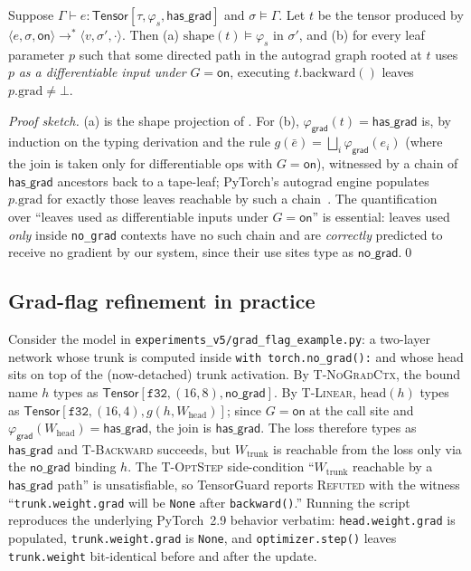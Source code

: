 \begin{theorem}
\label{thm:grad-soundness}
Suppose $\Gamma\vdash e:\mathsf{Tensor}[\tau,\varphi_s,\mathsf{has\_grad}]$
and $\sigma\models\Gamma$. Let $t$ be the tensor produced by
$\langle e,\sigma,\mathsf{on}\rangle\to^*\langle v,\sigma',\cdot\rangle$.
Then (a) $\mathrm{shape}(t)\models\varphi_s$ in $\sigma'$, and
(b) for every leaf parameter $p$ such that some directed path in
the autograd graph rooted at $t$ uses $p$ \emph{as a
differentiable input under} $G=\mathsf{on}$, executing
$t.\mathrm{backward}()$ leaves $p.\mathrm{grad}\neq\bot$.
\end{theorem}
\begin{proof}[Proof sketch]
(a) is the shape projection of . For (b),
$\varphi_{\mathsf{grad}}(t)=\mathsf{has\_grad}$ is, by induction
on the typing derivation and the rule
$g(\bar e)=\bigsqcup_i\varphi_{\mathsf{grad}}(e_i)$ (where the
join is taken only for differentiable ops with $G=\mathsf{on}$),
witnessed by a chain of $\mathsf{has\_grad}$ ancestors back to a
tape-leaf; PyTorch's autograd engine populates
$p.\mathrm{grad}$ for exactly those leaves
reachable by such a chain~\cite{paszke2019pytorch}. The
quantification over ``leaves used as differentiable inputs under
$G=\mathsf{on}$'' is essential: leaves used \emph{only} inside
\texttt{no\_grad} contexts have no such chain and are
\emph{correctly} predicted to receive no gradient by our system,
since their use sites type as $\mathsf{no\_grad}$.\qed
\end{proof}

\subsection{Grad-flag refinement in practice}
\label{sec:rt:gradflag}

Consider the model in
\texttt{experiments\_v5/grad\_flag\_example.py}: a
two-layer network whose trunk is computed inside
\texttt{with torch.no\_grad():} and whose head sits on top of
the (now-detached) trunk activation. By
\textsc{T-NoGradCtx}, the bound name $h$ types as
$\mathsf{Tensor}[\mathtt{f32},(16,8),\mathsf{no\_grad}]$. By
\textsc{T-Linear}, $\mathrm{head}(h)$ types as
$\mathsf{Tensor}[\mathtt{f32},(16,4),g(h,W_{\mathrm{head}})]$;
since $G=\mathsf{on}$ at the call site and
$\varphi_{\mathsf{grad}}(W_{\mathrm{head}})=\mathsf{has\_grad}$,
the join is $\mathsf{has\_grad}$. The loss therefore types as
$\mathsf{has\_grad}$ and \textsc{T-Backward} succeeds, but
$W_{\mathrm{trunk}}$ is reachable from the loss only via the
$\mathsf{no\_grad}$ binding $h$. The
\textsc{T-OptStep} side-condition
``$W_{\mathrm{trunk}}$ reachable by a $\mathsf{has\_grad}$ path''
is unsatisfiable, so TensorGuard reports
\textsc{Refuted} with the witness ``\texttt{trunk.weight.grad}
will be \texttt{None} after \texttt{backward()}.'' Running the
script reproduces the underlying PyTorch~2.9 behavior verbatim:
\texttt{head.weight.grad} is populated,
\texttt{trunk.weight.grad} is \texttt{None}, and
\texttt{optimizer.step()} leaves \texttt{trunk.weight}
bit-identical before and after the update.

